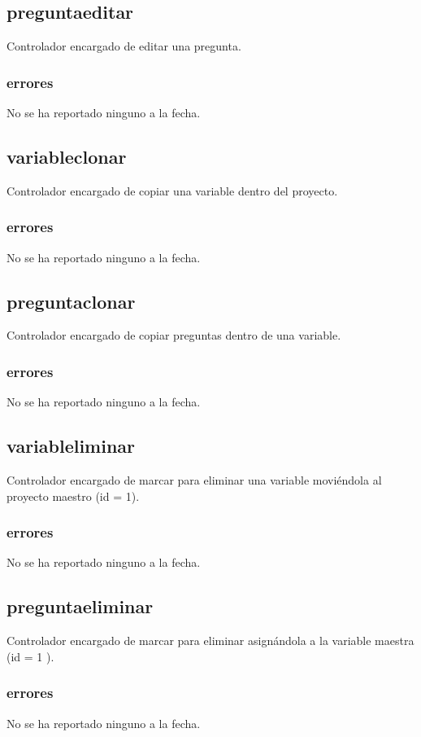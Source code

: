 \documentclass[10pt,a4paper]{book}
\begin{document}
	\subsection{preguntaeditar}
	Controlador encargado de editar una pregunta.
	\subsubsection{errores}
	No se ha reportado ninguno a la fecha.

	\subsection{variableclonar}
	Controlador encargado de copiar una variable dentro del proyecto.
	\subsubsection{errores}
	No se ha reportado ninguno a la fecha.

	\subsection{preguntaclonar}
	Controlador encargado de copiar preguntas dentro de una variable.
	\subsubsection{errores}
	No se ha reportado ninguno a la fecha.

	\subsection{variableliminar}
	Controlador encargado de marcar para eliminar una variable moviéndola al proyecto maestro (id = 1).
	\subsubsection{errores}
	No se ha reportado ninguno a la fecha.

	\subsection{preguntaeliminar}
	Controlador encargado de marcar para eliminar asignándola a la variable maestra (id = 1 ).
	\subsubsection{errores}
	No se ha reportado ninguno a la fecha.
\end{document}
